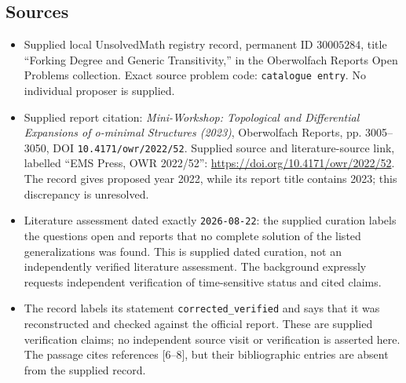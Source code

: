 \documentclass[11pt]{article}
\begin{document}
\subsection{Sources}
\begin{itemize}
\item Supplied local UnsolvedMath registry record, permanent ID \(30005284\), title ``Forking Degree and Generic Transitivity,'' in the Oberwolfach Reports Open Problems collection. Exact source problem code: \texttt{catalogue entry}. No individual proposer is supplied.
\item Supplied report citation: \emph{Mini-Workshop: Topological and Differential Expansions of o-minimal Structures (2023)}, Oberwolfach Reports, pp. 3005--3050, DOI \texttt{10.4171/owr/2022/52}. Supplied source and literature-source link, labelled ``EMS Press, OWR 2022/52'': \url{https://doi.org/10.4171/owr/2022/52}. The record gives proposed year 2022, while its report title contains 2023; this discrepancy is unresolved.
\item Literature assessment dated exactly \texttt{2026-08-22}: the supplied curation labels the questions open and reports that no complete solution of the listed generalizations was found. This is supplied dated curation, not an independently verified literature assessment. The background expressly requests independent verification of time-sensitive status and cited claims.
\item The record labels its statement \texttt{corrected\_verified} and says that it was reconstructed and checked against the official report. These are supplied verification claims; no independent source visit or verification is asserted here. The passage cites references [6--8], but their bibliographic entries are absent from the supplied record.
\end{itemize}
\end{document}
